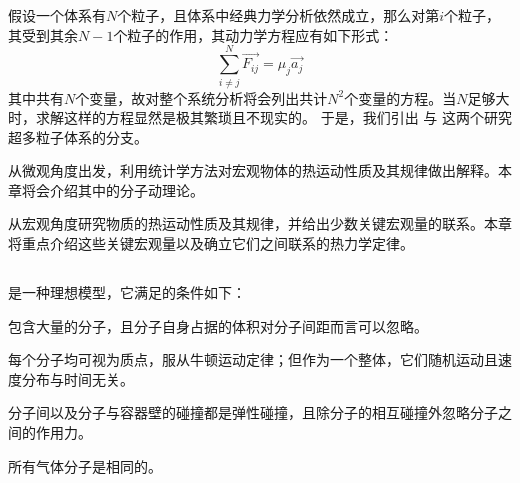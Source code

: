 \chapter[热力学]{}
\section[导论]{}
假设一个体系有$N$个粒子，且体系中经典力学分析依然成立，那么对第$i$个粒子，其受到其余$N-1$个粒子的作用，其动力学方程应有如下形式：
\begin{equation*}
    \sum_{i\neq j}^N \vec{F_{ij}} = \mu_j \vec{a_j}
\end{equation*}
其中共有$N$个变量，故对整个系统分析将会列出共计$N^2$个变量的方程。当$N$足够大时，求解这样的方程显然是极其繁琐且不现实的。
于是，我们引出  与  这两个研究超多粒子体系的分支。

 从微观角度出发，利用统计学方法对宏观物体的热运动性质及其规律做出解释。本章将会介绍其中的分子动理论。

 从宏观角度研究物质的热运动性质及其规律，并给出少数关键宏观量的联系。本章将重点介绍这些关键宏观量以及确立它们之间联系的热力学定律。
\section[理想气体]{}
 是一种理想模型，它满足的条件如下：

\begin{Itemize}
    \item 包含大量的分子，且分子自身占据的体积对分子间距而言可以忽略。
    \item 每个分子均可视为质点，服从牛顿运动定律；但作为一个整体，它们随机运动且速度分布与时间无关。
    \item 分子间以及分子与容器壁的碰撞都是弹性碰撞，且除分子的相互碰撞外忽略分子之间的作用力。
    \item 所有气体分子是相同的。
\end{Itemize}

